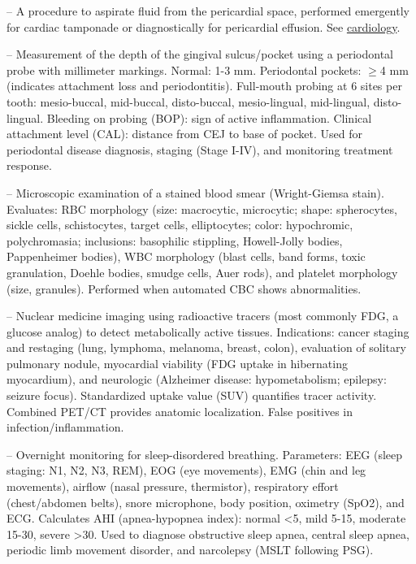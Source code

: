 -- A procedure to aspirate fluid from the pericardial space, performed emergently for cardiac tamponade or diagnostically for pericardial effusion. See \hyperlink{Cardiology}{cardiology}.

-- Measurement of the depth of the gingival sulcus/pocket using a periodontal probe with millimeter markings. Normal: 1-3 mm. Periodontal pockets: \(\ge\)4 mm (indicates attachment loss and periodontitis). Full-mouth probing at 6 sites per tooth: mesio-buccal, mid-buccal, disto-buccal, mesio-lingual, mid-lingual, disto-lingual. Bleeding on probing (BOP): sign of active inflammation. Clinical attachment level (CAL): distance from CEJ to base of pocket. Used for periodontal disease diagnosis, staging (Stage I-IV), and monitoring treatment response.

-- Microscopic examination of a stained blood smear (Wright-Giemsa stain). Evaluates: RBC morphology (size: macrocytic, microcytic; shape: spherocytes, sickle cells, schistocytes, target cells, elliptocytes; color: hypochromic, polychromasia; inclusions: basophilic stippling, Howell-Jolly bodies, Pappenheimer bodies), WBC morphology (blast cells, band forms, toxic granulation, Doehle bodies, smudge cells, Auer rods), and platelet morphology (size, granules). Performed when automated CBC shows abnormalities.

-- Nuclear medicine imaging using radioactive tracers (most commonly FDG, a glucose analog) to detect metabolically active tissues. Indications: cancer staging and restaging (lung, lymphoma, melanoma, breast, colon), evaluation of solitary pulmonary nodule, myocardial viability (FDG uptake in hibernating myocardium), and neurologic (Alzheimer disease: hypometabolism; epilepsy: seizure focus). Standardized uptake value (SUV) quantifies tracer activity. Combined PET/CT provides anatomic localization. False positives in infection/inflammation.

-- Overnight monitoring for sleep-disordered breathing. Parameters: EEG (sleep staging: N1, N2, N3, REM), EOG (eye movements), EMG (chin and leg movements), airflow (nasal pressure, thermistor), respiratory effort (chest/abdomen belts), snore microphone, body position, oximetry (SpO2), and ECG. Calculates AHI (apnea-hypopnea index): normal <5, mild 5-15, moderate 15-30, severe >30. Used to diagnose obstructive sleep apnea, central sleep apnea, periodic limb movement disorder, and narcolepsy (MSLT following PSG).

